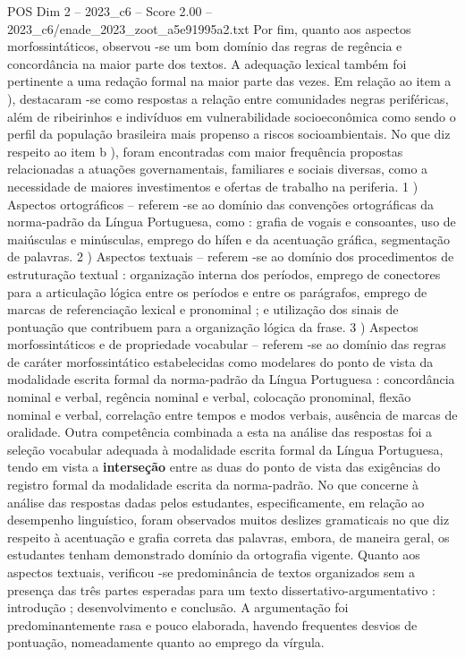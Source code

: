 \begin{textsample}{POS Dim 2 – 2023\_c6 – Score 2.00 – 2023\_c6/enade\_2023\_zoot\_a5e91995a2.txt}
Por fim, quanto aos aspectos morfossintáticos, observou -se um bom domínio das regras de regência e concordância na maior parte dos textos.
A adequação lexical também foi pertinente a uma redação formal na maior parte das vezes.
Em relação ao item a ), destacaram -se como respostas a relação entre comunidades negras periféricas, além de ribeirinhos e indivíduos em vulnerabilidade socioeconômica como sendo o perfil da população brasileira mais propenso a riscos socioambientais.
No que diz respeito ao item b ), foram encontradas com maior frequência propostas relacionadas a atuações governamentais, familiares e sociais diversas, como a necessidade de maiores investimentos e ofertas de trabalho na periferia. 1 ) Aspectos ortográficos – referem -se ao domínio das convenções ortográficas da norma-padrão da Língua Portuguesa, como : grafia de vogais e consoantes, uso de maiúsculas e minúsculas, emprego do hífen e da acentuação gráfica, segmentação de palavras. 2 ) Aspectos textuais – referem -se ao domínio dos procedimentos de estruturação textual : organização interna dos períodos, emprego de conectores para a articulação lógica entre os períodos e entre os parágrafos, emprego de marcas de referenciação lexical e pronominal ; e utilização dos sinais de pontuação que contribuem para a organização lógica da frase. 3 ) Aspectos morfossintáticos e de propriedade vocabular – referem -se ao domínio das regras de caráter morfossintático estabelecidas como modelares do ponto de vista da modalidade escrita formal da norma-padrão da Língua Portuguesa : concordância nominal e verbal, regência nominal e verbal, colocação pronominal, flexão nominal e verbal, correlação entre tempos e modos verbais, ausência de marcas de oralidade.
Outra competência combinada a esta na análise das respostas foi a seleção vocabular adequada à modalidade escrita formal da Língua Portuguesa, tendo em vista a \textbf{interseção} entre as duas do ponto de vista das exigências do registro formal da modalidade escrita da norma-padrão.
No que concerne à análise das respostas dadas pelos estudantes, especificamente, em relação ao desempenho linguístico, foram observados muitos deslizes gramaticais no que diz respeito à acentuação e grafia correta das palavras, embora, de maneira geral, os estudantes tenham demonstrado domínio da ortografia vigente.
Quanto aos aspectos textuais, verificou -se predominância de textos organizados sem a presença das três partes esperadas para um texto dissertativo-argumentativo : introdução ; desenvolvimento e conclusão.
A argumentação foi predominantemente rasa e pouco elaborada, havendo frequentes desvios de pontuação, nomeadamente quanto ao emprego da vírgula.

\end{textsample}
